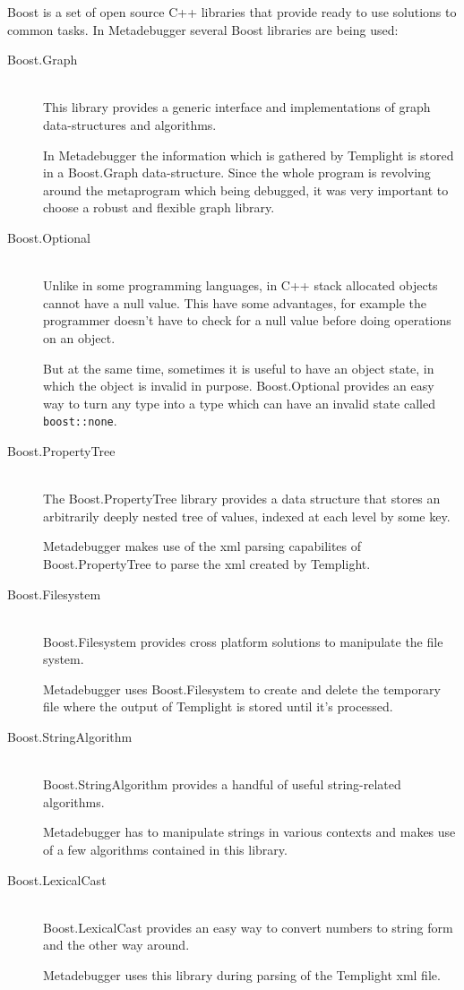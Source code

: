 Boost is a set of open source C++ libraries that provide ready to use solutions
to common tasks. In Metadebugger several Boost libraries are being used:
\begin{description}
    \item[Boost.Graph] \hfill \\
        This library provides a generic interface and implementations of graph
        data-structures and algorithms.

        In Metadebugger the information which is gathered by Templight is
        stored in a Boost.Graph data-structure. Since the whole program is
        revolving around the metaprogram which being debugged, it was very
        important to choose a robust and flexible graph library.
    \item[Boost.Optional] \hfill \\
        Unlike in some programming languages, in C++ stack allocated objects
        cannot have a null value. This have some advantages, for example the
        programmer doesn't have to check for a null value before doing
        operations on an object.

        But at the same time, sometimes it is useful to have an object state,
        in which the object is invalid in purpose. Boost.Optional provides an
        easy way to turn any type into a type which can have an invalid state
        called \lstinline[language=C++]|boost::none|.
    \item[Boost.PropertyTree] \hfill \\
        The Boost.PropertyTree library provides a data structure that stores an
        arbitrarily deeply nested tree of values, indexed at each level by some
        key.

        Metadebugger makes use of the xml parsing capabilites of
        Boost.PropertyTree to parse the xml created by Templight.
    \item[Boost.Filesystem] \hfill \\
        Boost.Filesystem provides cross platform solutions to manipulate the
        file system.

        Metadebugger uses Boost.Filesystem to create and delete the temporary
        file where the output of Templight is stored until it's processed.
    \item[Boost.StringAlgorithm] \hfill \\
        Boost.StringAlgorithm provides a handful of useful string-related
        algorithms.

        Metadebugger has to manipulate strings in various contexts and makes
        use of a few algorithms contained in this library.
    \item[Boost.LexicalCast] \hfill \\
        Boost.LexicalCast provides an easy way to convert numbers to string
        form and the other way around.

        Metadebugger uses this library during parsing of the Templight xml
        file.
\end{description}

